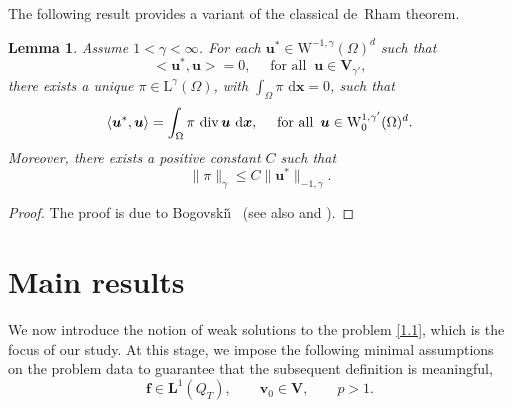 \documentclass[12pt,reqno]{amsart}
\numberwithin{equation}{section}
\newtheorem{lemma}[theorem]{Lemma}
\let\originalleft\left
\let\originalright\right
\renewcommand{\left}{\mathopen{}\mathclose\bgroup\originalleft}
\renewcommand{\right}{\aftergroup\egroup\originalright}
\theoremstyle{definition}
\def\1{\Omega}
\def\dx{\,\mathrm{d}\boldsymbol{x}}
\def\div{\operatorname{div}}
\def\W{\mathrm{W}}
\def\L{\mathrm{L}}
\def\uu{\boldsymbol{u}}  %
\def\vv{\boldsymbol{v}}
\def\f{\boldsymbol{f}}
\def\bfL{\mathbf{L}}
\def\bfV{\mathbf{V}}
\begin{document}
The following result provides a variant of the classical de~Rham theorem.
\begin{lemma}\label{lemm:BP}
	Assume $1<\gamma<\infty$.
 For each $\uu^\ast\in\W^{-1,\gamma}(\1)^d$ such that
		\begin{equation*}%
			\big< \uu^{\ast},\uu\big>=0, \quad \text{ for all }\ \uu\in
			\mathbf{V}_{\gamma'},
		\end{equation*}
		there exists a unique $\pi\in \L^{\gamma}(\1)$, with $\int_{\1}\pi\,\dx=0$, such that
		\begin{equation*}
			\left\langle \uu^\ast,\uu\right\rangle =
			\int_{\1}\pi\, \div\uu\,\dx,\quad\text{ for all }\,\uu\in\W_{0}^{1,\gamma'}(\1)^d.
		\end{equation*}
		Moreover, there exists a positive constant $C$ such that
		\begin{equation*}%
			\|\pi\|_{\gamma}\leq C \|\uu^\ast\|_{-1,\gamma}.
		\end{equation*}
\end{lemma}
\begin{proof}
	The proof is due to {Bogovski\v{\i}}~\cite{MEB} (see also \cite[Theorems~III.3.1 and III.5.3]{Galdi:2011} and \cite[Proposition I.1.1]{Te}).
\end{proof}





\section{Main results}\label{main:res}

{
We now introduce the notion of weak solutions to the problem \eqref{1.1}, which is the focus of our study.
At this stage, we impose the following minimal assumptions on the problem data to guarantee that the subsequent definition is meaningful,
\begin{equation}\label{hyp:def:ws}
\f\in\bfL^1(Q_T),\qquad  \vv_0\in\bfV,\qquad p>1.
\end{equation}
}
\end{document}
